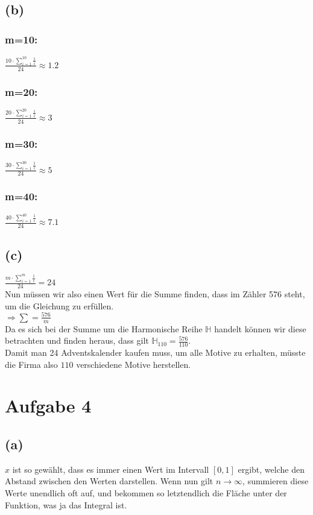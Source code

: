 \documentclass[a4paper]{scrartcl}
\begin{document}
\subsection*{(b)}
\subsubsection*{m=10:}
$\frac{10 \cdot \sum_{i=1}^{10}\frac{1}{i}}{24} \approx 1.2$

\subsubsection*{m=20:}
$\frac{20 \cdot \sum_{i=1}^{20}\frac{1}{i}}{24} \approx 3$

\subsubsection*{m=30:}
$\frac{30 \cdot \sum_{i=1}^{30}\frac{1}{i}}{24} \approx 5$

\subsubsection*{m=40:}
$\frac{40 \cdot \sum_{i=1}^{40}\frac{1}{i}}{24} \approx 7.1$



\subsection*{(c)}
$
\frac{m \cdot \sum_{i=1}^{m}\frac{1}{i}}{24} = 24
$\\
Nun müssen wir also einen Wert für die Summe finden, dass im Zähler 576 steht, um die Gleichung zu erfüllen.\\
$\Rightarrow \sum = \frac{576}{m}$\\
Da es sich bei der Summe um die Harmonische Reihe $\mathbb{H}$ handelt können wir diese betrachten und finden heraus, dass gilt $\mathbb{H}_{110} = \frac{576}{110}$.\\
Damit man 24 Adventskalender kaufen muss, um alle Motive zu erhalten, müsste die Firma also $110$ verschiedene Motive herstellen.


\section*{Aufgabe 4}
\subsection*{(a)}
$x$ ist so gewählt, dass es immer einen Wert im Intervall $[0,1]$ ergibt, welche den Abstand zwischen den Werten darstellen. Wenn nun gilt $n \rightarrow \infty$, summieren diese Werte unendlich oft auf, und bekommen so letztendlich die Fläche unter der Funktion, was ja das Integral ist.
\end{document}
